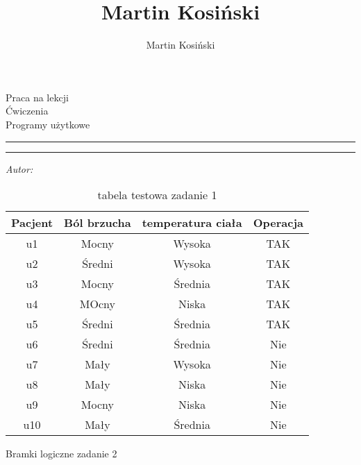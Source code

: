 \documentclass[a4paper]{article}
\title{Martin Kosiński}
\author{Martin Kosiński}
\makeatletter
\newcommand{\linia}{\rule{\linewidth}{0.4mm}}
\renewcommand{\maketitle}{\begin{titlepage}
    \vspace*{1cm}
    \begin{center}\small
   Praca na lekcji\\
    Ćwiczenia\\
    Programy użytkowe
    \end{center}
    \vspace{3cm}
    \noindent\linia
    \begin{center}
      \LARGE \textsc{\@title}
         \end{center}
     \linia
    \vspace{0.5cm}
    \begin{flushright}
    \begin{minipage}{5cm}
    \textit{\small Autor:}\\
    \normalsize \textsc{\@author} \par
    \end{minipage}
     \end{flushright}
    \vspace*{\stretch{6}}
    \begin{center}
    \@date
    \end{center}
  \end{titlepage}%
}
\makeatother
\begin{document}
\maketitle
\begin{center}


\begin{table}[h]
\centering\caption{tabela testowa zadanie 1 }

\begin{tabular}{|c| c c c }
\hline
Pacjent & Ból brzucha & temperatura ciała & Operacja\\
\hline
u1 & Mocny & Wysoka & TAK\\
u2 & Średni & Wysoka & TAK\\
u3 & Mocny & Średnia & TAK\\
u4 & MOcny & Niska & TAK\\
u5 & Średni & Średnia & TAK\\
u6 & Średni & Średnia & Nie\\
u7 & Mały & Wysoka & Nie\\
u8 & Mały & Niska & Nie\\
u9 & Mocny & Niska & Nie\\
u10 & Mały & Średnia & Nie\\
\hline



\end{tabular}

\end{table}
\begin{table}[h]
\centering\caption{Bramki logiczne zadanie 2 }


\end{table}
\end{center}
\end{document}
